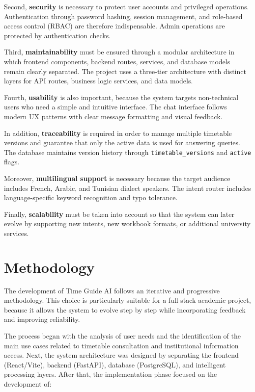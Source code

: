 Second, \textbf{security} is necessary to protect user accounts and privileged operations. Authentication through password hashing, session management, and role-based access control (RBAC) are therefore indispensable. Admin operations are protected by authentication checks.

Third, \textbf{maintainability} must be ensured through a modular architecture in which frontend components, backend routes, services, and database models remain clearly separated. The project uses a three-tier architecture with distinct layers for API routes, business logic services, and data models.

Fourth, \textbf{usability} is also important, because the system targets non-technical users who need a simple and intuitive interface. The chat interface follows modern UX patterns with clear message formatting and visual feedback.

In addition, \textbf{traceability} is required in order to manage multiple timetable versions and guarantee that only the active data is used for answering queries. The database maintains version history through \texttt{timetable\_versions} and \texttt{active} flags.

Moreover, \textbf{multilingual support} is necessary because the target audience includes French, Arabic, and Tunisian dialect speakers. The intent router includes language-specific keyword recognition and typo tolerance.

Finally, \textbf{scalability} must be taken into account so that the system can later evolve by supporting new intents, new workbook formats, or additional university services.

\section{Methodology}
The development of Time Guide AI follows an iterative and progressive methodology. This choice is particularly suitable for a full-stack academic project, because it allows the system to evolve step by step while incorporating feedback and improving reliability.

The process began with the analysis of user needs and the identification of the main use cases related to timetable consultation and institutional information access. Next, the system architecture was designed by separating the frontend (React/Vite), backend (FastAPI), database (PostgreSQL), and intelligent processing layers. After that, the implementation phase focused on the development of:

